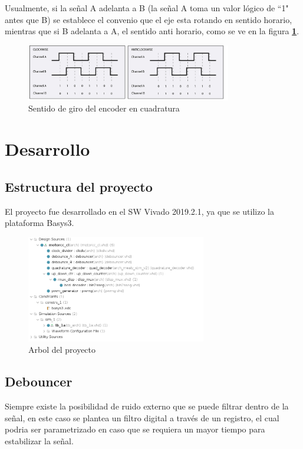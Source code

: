 \documentclass[11pt, a4paper]{article}
\begin{document}
Usualmente, si la señal A adelanta a B (la señal A toma un valor lógico de ``1" antes que B) se establece el convenio que el eje esta rotando en sentido horario, mientras que si B adelanta a A, el sentido anti horario, como se ve en la figura \textcolor{blue}{\textbf{\ref{fig:encoder_cuadratura}}}.
\begin{figure}[h]
	\centering
	\includegraphics[width=0.8\textwidth]{Imagenes/encoder_cuadratura.jpg}
	\caption{Sentido de giro del encoder en cuadratura}
	\label{fig:encoder_cuadratura}
\end{figure} 

\clearpage
\section{Desarrollo}

	\subsection{Estructura del proyecto}
	El proyecto fue desarrollado en el SW Vivado 2019.2.1, ya que se utilizo la plataforma Basys3.

	\begin{figure}[H]
		\centering
		\includegraphics[width=0.7\textwidth]{Imagenes/estructura.png}
		\caption{Arbol del proyecto}
		\label{fig:proyecto_vivado}
	\end{figure} 

	\subsection{Debouncer}
	Siempre existe la posibilidad de ruido externo que se puede filtrar dentro de la señal, en este caso se plantea un filtro digital a través de un registro, el cual podria ser parametrizado en caso que se requiera un mayor tiempo para estabilizar la señal.
\end{document}

